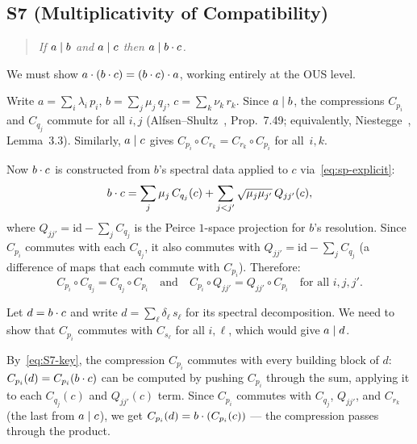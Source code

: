 \subsection*{S7 (Multiplicativity of Compatibility)}

\begin{quote}
\emph{If $a \compatible b$ and $a \compatible c$ then
$a \compatible \sp{b}{c}$.}
\end{quote}

We must show $\sp{a}{(\sp{b}{c})} = \sp{(\sp{b}{c})}{a}$,
working entirely at the OUS level.

Write $a = \sum_i \lambda_i\, p_i$, $b = \sum_j \mu_j\, q_j$,
$c = \sum_k \nu_k\, r_k$. Since $a \compatible b$, the compressions
$C_{p_i}$ and $C_{q_j}$ commute for all $i,j$
(Alfsen--Shultz~\cite{AlfsenShultz2003}, Prop.~7.49; equivalently,
Niestegge~\cite{Niestegge2009}, Lemma~3.3). Similarly, $a \compatible c$
gives $C_{p_i} \circ C_{r_k} = C_{r_k} \circ C_{p_i}$ for all~$i,k$.

Now $\sp{b}{c}$ is constructed from $b$'s spectral data applied to $c$
via~\eqref{eq:sp-explicit}:
\[
  \sp{b}{c}
  = \sum_j \mu_j\, C_{q_j}(c)
  + \sum_{j<j'} \sqrt{\mu_j\mu_{j'}}\, Q_{jj'}(c),
\]
where $Q_{jj'} = \mathrm{id} - \sum_j C_{q_j}$ is the Peirce $1$-space
projection for $b$'s resolution. Since $C_{p_i}$ commutes with each
$C_{q_j}$, it also commutes with $Q_{jj'} = \mathrm{id} - \sum_j C_{q_j}$
(a difference of maps that each commute with $C_{p_i}$). Therefore:
\begin{equation}\label{eq:S7-key}
  C_{p_i} \circ C_{q_j} = C_{q_j} \circ C_{p_i}
  \quad\text{and}\quad
  C_{p_i} \circ Q_{jj'} = Q_{jj'} \circ C_{p_i}
  \quad\text{for all } i,j,j'.
\end{equation}

Let $d = \sp{b}{c}$ and write $d = \sum_\ell \delta_\ell\, s_\ell$ for
its spectral decomposition. We need to show that $C_{p_i}$ commutes with
$C_{s_\ell}$ for all $i, \ell$, which would give $a \compatible d$.

By~\eqref{eq:S7-key}, the compression $C_{p_i}$ commutes with every
building block of $d$: $C_{p_i}(d) = C_{p_i}(\sp{b}{c})$ can be computed
by pushing $C_{p_i}$ through the sum, applying it to each $C_{q_j}(c)$
and $Q_{jj'}(c)$ term. Since $C_{p_i}$ commutes with $C_{q_j}$,
$Q_{jj'}$, and $C_{r_k}$ (the last from $a \compatible c$), we get
$C_{p_i}(d) = \sp{b}{(C_{p_i}(c))}$ --- the compression passes through
the product.

